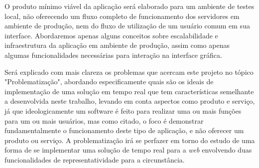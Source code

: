 O produto mínimo viável da aplicação será elaborado para um ambiente de testes local, não oferecendo um fluxo completo de funcionamento dos servidores em ambiente de produção, nem do fluxo de utilização de um usuário comum em sua interface. Abordaremos apenas alguns conceitos sobre escalabilidade e infraestrutura da aplicação em ambiente de produção, assim como apenas algumas funcionalidades necessárias para interação na interface gráfica.

Será explicado com mais clareza os problemas que acercam este projeto no tópico "Problematização", abordando especificamente quais são os ideais de implementação de uma solução em tempo real que tem características semelhante a desenvolvida neste trabalho, levando em conta aspectos como produto e serviço, já que ideologicamente um software é feito para realizar uma ou mais funções para um ou mais usuários, mas como citado, o foco é demonstrar fundamentalmente o funcionamento deste tipo de aplicação, e não oferecer um produto ou serviço. A problematização irá se perfazer em torno do estudo de uma forma de se implementar uma solução de tempo real para a \textit{web} envolvendo duas funcionalidades de representatividade para a circunstância.
